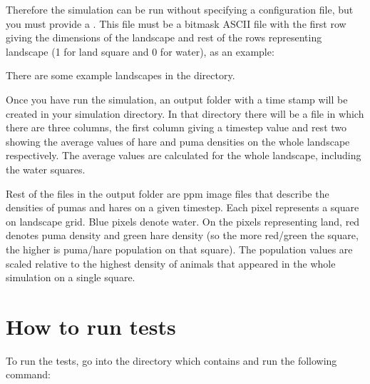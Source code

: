 \documentclass[letterpaper,10pt,english]{sphinxmanual}
\begin{document}
Therefore the simulation can be run without specifying a configuration file, but you must provide a . This file must be a bitmask ASCII file with the first row giving the dimensions of the landscape and rest of the rows representing landscape (1 for land square and 0 for water), as an example:

\begin{sphinxVerbatim}[commandchars=\\\{\}]
 

      
      
      
      
      
\end{sphinxVerbatim}

There are some example landscapes in the  directory.

Once you have run the simulation, an output folder with a time stamp  will be created in your simulation directory. In that directory there will be a file  in which there are three columns, the first column giving a timestep value and rest two showing the average values of hare and puma densities on the whole landscape respectively. The average values are calculated for the whole landscape, including the water squares.

Rest of the files in the output folder are ppm image files that describe the densities of pumas and hares on a given timestep. Each pixel represents a square on landscape grid. Blue pixels denote water. On the pixels representing land, red denotes puma density and green hare density (so the more red/green the square, the higher is puma/hare population on that square). The population values are scaled relative to the highest density of animals that appeared in the whole simulation on a single square.


\chapter{How to  run tests}
\label{\detokenize{index:how-to-run-tests}}
To run the tests, go into the directory which contains  and run the following command:
\end{document}
